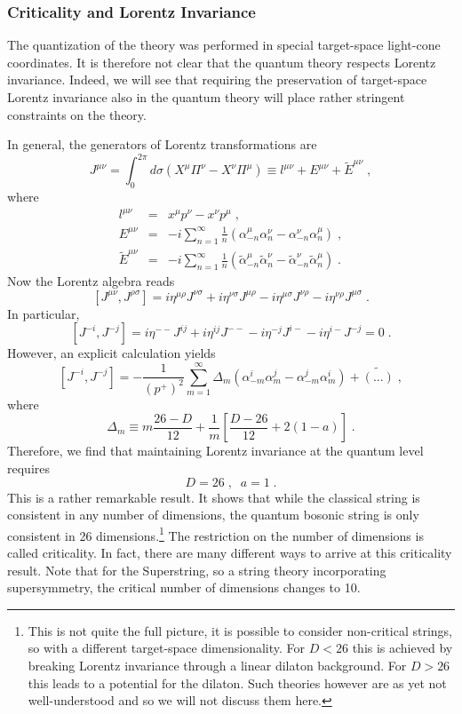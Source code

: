 \documentclass[11pt,a4paper]{article}
\numberwithin{equation}{section}
\numberwithin{table}{section}\setlength{\multlinegap}{25pt}
\newcommand{\bea}{\begin{eqnarray}}  \newcommand{\eea}{\end{eqnarray}}
\newcommand{\nn}{\nonumber}
\newcommand{\be}{\begin{equation}}
\newcommand{\ee}{\end{equation}}
\begin{document}
\subsubsection{Criticality and Lorentz Invariance}

The quantization of the theory was performed in special target-space light-cone coordinates. It is therefore not clear that the quantum theory respects Lorentz invariance. Indeed, we will see that requiring the preservation of target-space Lorentz invariance also in the quantum theory will place rather stringent constraints on the theory. 

In general, the generators of Lorentz transformations are
\be
J^{\mu\nu} = \int_0^{2\pi} d\sigma \left( X^{\mu} \Pi^{\nu} - X^{\nu}\Pi^{\mu}\right) \equiv l^{\mu\nu} + E^{\mu\nu} + \tilde{E}^{\mu\nu} \;,
\label{amg}
\ee
where
\bea
l^{\mu\nu} &=& x^{\mu} p^{\nu} - x^{\nu}p^{\mu} \;, \nn \\
E^{\mu\nu} &=& -i \sum_{n=1}^{\infty} \frac{1}{n} \left( \alpha_{-n}^{\mu} \alpha_n^{\nu} -  \alpha_{-n}^{\nu} \alpha_n^{\mu}\right) \;, \nn \\
\tilde{E}^{\mu\nu} &=& -i \sum_{n=1}^{\infty} \frac{1}{n} \left( \tilde{\alpha}_{-n}^{\mu} \tilde{\alpha}_n^{\nu} -  \tilde{\alpha}_{-n}^{\nu} \tilde{\alpha}_n^{\mu}\right) \;.
\eea
Now the Lorentz algebra reads
\be
\left[J^{\mu\nu},J^{\rho\sigma} \right] = i \eta^{\mu\rho}J^{\nu\sigma} + i \eta^{\nu \sigma} J^{\mu \rho} - i \eta^{\mu\sigma} J^{\nu \rho} -i \eta^{\nu\rho} J^{\mu\sigma}\;.
\ee
In particular,
\be
\left[J^{-i},J^{-j} \right] = i \eta^{--}J^{ij} + i \eta^{ij} J^{--} - i \eta^{-j} J^{i-} -i \eta^{i-} J^{-j} = 0 \;.
\ee
However, an explicit calculation yields
\be
\left[J^{-i},J^{-j} \right]  = -\frac{1}{\left(p^+\right)^2} \sum_{m=1}^{\infty} \Delta_m \left( \alpha_{-m}^i \alpha^j_{m} - \alpha_{-m}^j \alpha_{m}^i\right) + \tilde{\left(...\right)} \;,
\label{conan}
\ee
where
\be
\Delta_m \equiv m \frac{26-D}{12} + \frac{1}{m}\left[ \frac{D-26}{12} + 2\left(1-a\right)\right]\;.
\ee
Therefore, we find that maintaining Lorentz invariance at the quantum level requires
\be
D=26 \;,\;\; a=1 \;.
\label{crit}
\ee
This is a rather remarkable result. It shows that while the classical string is consistent in any number of dimensions, the quantum bosonic string is only consistent in 26 dimensions.\footnote{This is not quite the full picture, it is possible to consider non-critical strings, so with a different target-space dimensionality. For $D<26$ this is achieved by breaking Lorentz invariance through a linear dilaton background. For $D>26$ this leads to a potential for the dilaton. Such theories however are as yet not well-understood and so we will not discuss them here.} The restriction on the number of dimensions is called criticality.  In fact, there are many different ways to arrive at this criticality result. Note that for the Superstring, so a string theory incorporating supersymmetry, the critical number of dimensions changes to 10.
\end{document}
